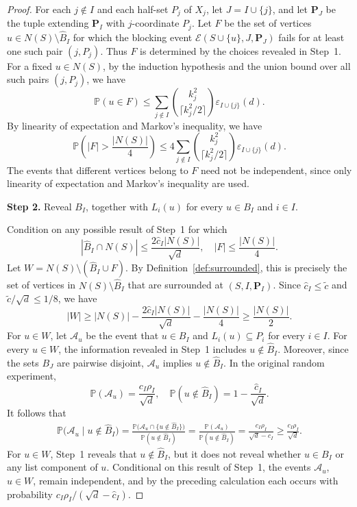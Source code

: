 \documentclass[12pt]{article}
\numberwithin{equation}{section}
\theoremstyle{definition}
\newcommand{\Prob}{\mathbb{P}}
\begin{document}
\begin{proof}
For each $j \notin I$ and each half-set $P_j$ of $X_j$, let
$J = I \cup \{j\}$, and let $\mathbf{P}_J$ be the tuple extending $\mathbf{P}_I$
with $j$-coordinate $P_j$. Let $F$ be the set of vertices
$u \in N(S) \setminus \hat{B}_{I}$ for which the blocking event
$\mathcal{E}(S \cup \{u\},J,\mathbf{P}_J)$ fails for at least one such pair
$(j,P_j)$. Thus $F$ is determined by the choices revealed in Step~1.
For a fixed $u \in N(S)$, by the induction hypothesis and the union bound over
all such pairs $(j, P_j)$, we have
\[
 \Prob(u \in F) \leq
 \sum_{j \notin I}
 \binom{k_j^2}{\lceil k_j^2/2\rceil}
 \varepsilon_{I \cup \{j\}}(d).
\]
By linearity of expectation and Markov's inequality, we have
\begin{equation}\label{eq:failed-vertex-tail}
 \Prob\left(|F| > \frac{|N(S)|}{4}\right)
 \leq 4\sum_{j \notin I}
 \binom{k_j^2}{\lceil k_j^2/2\rceil}
 \varepsilon_{I \cup \{j\}}(d).
\end{equation}
The events that different vertices belong to $F$ need not be independent,
since only linearity of expectation and Markov's inequality are used.

\medskip
\noindent
\textbf{Step 2.} Reveal $B_I$, together with $L_i(u)$ for every $u\in B_I$
and $i\in I$.
\par\nobreak
\medskip

Condition on any possible result of Step~1 for which
\begin{equation}\label{eq:first-step-bounds}
 |\hat{B}_{I} \cap N(S)|
 \leq \frac{2\hat{c}_{I}|N(S)|}{\sqrt{d}},
 \quad
 |F| \leq \frac{|N(S)|}{4}.
\end{equation}
Let $W=N(S)\setminus(\hat{B}_I\cup F)$. By
Definition~\ref{def:surrounded}, this is precisely the set of vertices in
$N(S)\setminus\hat{B}_I$ that are surrounded at
$(S,I,\mathbf{P}_I)$. Since $\hat{c}_I\leq\widetilde{c}$ and
$\widetilde{c}/\sqrt{d}\leq 1/8$, we have
\[
 |W| \geq |N(S)| - \frac{2\hat{c}_{I}|N(S)|}{\sqrt{d}}
 - \frac{|N(S)|}{4} \geq \frac{|N(S)|}{2}.
\]
For $u \in W$, let $\mathcal{A}_u$ be the event that $u \in B_I$ and
$L_i(u) \subseteq P_i$ for every $i \in I$.
For every $u \in W$, the information revealed in Step~1 includes
$u \notin \hat{B}_{I}$. Moreover, since the sets $B_J$ are pairwise
disjoint, $\mathcal{A}_u$ implies $u \notin \hat{B}_{I}$. In the original
random experiment,
\[
 \Prob(\mathcal{A}_u) = \frac{c_I\rho_I}{\sqrt{d}},
 \quad
 \Prob(u \notin \hat{B}_{I})
 = 1 - \frac{\hat{c}_{I}}{\sqrt{d}}.
\]
It follows that
\[
\begin{aligned}
 \Prob\bigl(\mathcal{A}_u \mid u \notin \hat{B}_{I}\bigr) =
 \frac{
 \Prob\bigl(\mathcal{A}_u
 \cap \{u \notin \hat{B}_{I}\}\bigr)}
 {\Prob(u \notin \hat{B}_{I})} =
 \frac{\Prob(\mathcal{A}_u)}
 {\Prob(u \notin \hat{B}_{I})} =
 \frac{c_I\rho_I}{\sqrt{d} - \hat{c}_{I}}
 \geq \frac{c_I\rho_I}{\sqrt{d}}.
\end{aligned}
\]
For $u\in W$, Step~1 reveals that $u\notin\hat{B}_I$, but it does not
reveal whether $u\in B_I$ or any list component of $u$. Conditional on this
result of Step~1, the events $\mathcal A_u$, $u\in W$, remain independent,
and by the preceding
calculation each occurs with probability
$c_I\rho_I/(\sqrt d-\hat c_I)$.


\end{proof}
\end{document}
